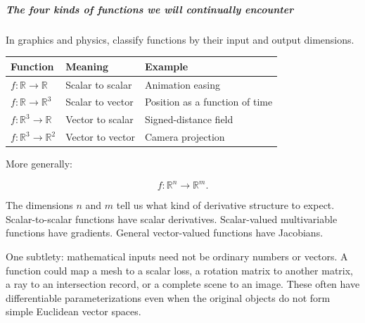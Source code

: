 \subparagraph{The four kinds of functions we will continually encounter}\label{01-foundations-i-ch020-the-four-kinds-of-functions-we-will-continually-encounter}

\hypertarget{01-foundations-i-ch020-the-four-kinds-of-functions-we-will-continually-encounter}{}

In graphics and physics, classify functions by their input and output dimensions.

{\def\LTcaptype{none} %
\begin{longtable}[]{@{}
  >{\raggedright\arraybackslash}p{}
  >{\raggedright\arraybackslash}p{}
  >{\raggedright\arraybackslash}p{}@{}}
\toprule\noalign{}
\begin{minipage}[b]{\linewidth}\raggedright
Function
\end{minipage} & \begin{minipage}[b]{\linewidth}\raggedright
Meaning
\end{minipage} & \begin{minipage}[b]{\linewidth}\raggedright
Example
\end{minipage} \\
\midrule\noalign{}
\endhead
\bottomrule\noalign{}
\endlastfoot
\(f:\mathbb R\to\mathbb R\) & Scalar to scalar & Animation easing \\
\(f:\mathbb R\to\mathbb R^3\) & Scalar to vector & Position as a function of time \\
\(f:\mathbb R^3\to\mathbb R\) & Vector to scalar & Signed-distance field \\
\(f:\mathbb R^3\to\mathbb R^2\) & Vector to vector & Camera projection \\
\end{longtable}
}

More generally:

\[
f:\mathbb R^n\rightarrow\mathbb R^m.
\]

The dimensions \(n\) and \(m\) tell us what kind of derivative structure to expect. Scalar-to-scalar functions have scalar derivatives. Scalar-valued multivariable functions have gradients. General vector-valued functions have Jacobians.

One subtlety: mathematical inputs need not be ordinary numbers or vectors. A function could map a mesh to a scalar loss, a rotation matrix to another matrix, a ray to an intersection record, or a complete scene to an image. These often have differentiable parameterizations even when the original objects do not form simple Euclidean vector spaces.

